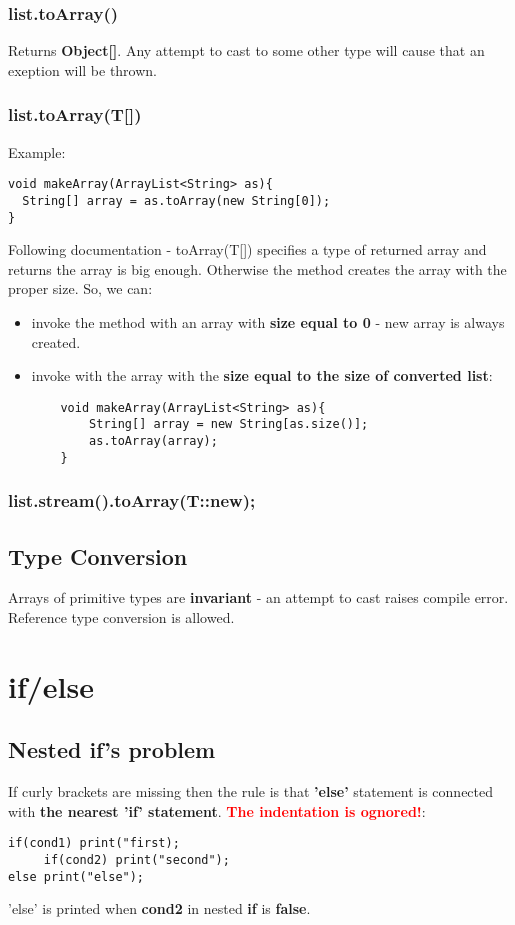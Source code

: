 \documentclass{report}
\begin{document}
\subsection{list.toArray()}
Returns \textbf{Object[]}. Any attempt to cast to some other type will cause that an exeption will be thrown.

\subsection{list.toArray(T[])}
Example:
\begin{verbatim}
void makeArray(ArrayList<String> as){
  String[] array = as.toArray(new String[0]);
}
\end{verbatim}

Following documentation - toArray(T[]) specifies a type of returned array and returns the array is big enough. Otherwise the method creates the array with the proper size.
So, we can:
\begin{itemize}
	\item invoke the method with an array with \textbf{size equal to 0} - new array is always created.
	\item invoke with the array with the \textbf{size equal to the size of converted list}:
	\begin{verbatim}
	void makeArray(ArrayList<String> as){
	    String[] array = new String[as.size()];
	    as.toArray(array);
	}
	\end{verbatim}
\end{itemize}

\subsection{list.stream().toArray(T{}::new);}


\section{Type Conversion}
Arrays of primitive types are \textbf{invariant} - an attempt to cast raises compile error. Reference type conversion is allowed.



\chapter{if/else}


\section{Nested if's problem}
If curly brackets are missing then the rule is that \textbf{'else'} statement is connected with \textbf{the nearest 'if' statement}.
\textbf{\textcolor{red}{The indentation is ognored!}}:
\begin{verbatim}
if(cond1) print("first);
     if(cond2) print("second");
else print("else");
\end{verbatim}
'else' is printed when \textbf{cond2} in nested \textbf{if} is \textbf{false}.
\end{document}
